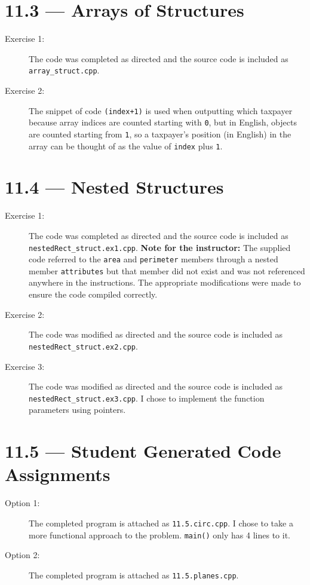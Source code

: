 \documentclass[11pt]{article}
\begin{document}
\section*{11.3 --- Arrays of Structures}
\begin{description}
    \item[Exercise 1:] The code was completed as directed and the source code is included as \texttt{array\_struct.cpp}.
    \item[Exercise 2:] The snippet of code \lstinline{(index+1)} is used when outputting which taxpayer because array indices are counted starting with \lstinline{0}, but in English, objects are counted starting from \lstinline{1}, so a taxpayer's position (in English) in the array can be thought of as the value of \lstinline{index} plus \lstinline{1}.
\end{description}

\section*{11.4 --- Nested Structures}
\begin{description}
    \item[Exercise 1:] The code was completed as directed and the source code is included as \texttt{nestedRect\_struct.ex1.cpp}. \textbf{Note for the instructor:} The supplied code referred to the \lstinline{area} and \lstinline{perimeter} members through a nested member \lstinline{attributes} but that member did not exist and was not referenced anywhere in the instructions. The appropriate modifications were made to ensure the code compiled correctly.
    \item[Exercise 2:] The code was modified as directed and the source code is included as \texttt{nestedRect\_struct.ex2.cpp}.
    \item[Exercise 3:] The code was modified as directed and the source code is included as \texttt{nestedRect\_struct.ex3.cpp}. I chose to implement the function parameters using pointers.
\end{description}

\section*{11.5 --- Student Generated Code Assignments}
\begin{description}
    \item[Option 1:] The completed program is attached as \texttt{11.5.circ.cpp}. I chose to take a more functional approach to the problem. \lstinline{main()} only has 4 lines to it.
    \item[Option 2:] The completed program is attached as \texttt{11.5.planes.cpp}.
\end{description}
\end{document}

